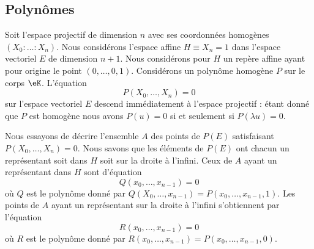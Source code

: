 \subsection{Polynômes}

Soit l'espace projectif de dimension \( n\) avec ses coordonnées homogènes \( (X_0:\ldots :X_n)\). Nous considérons l'espace affine \( H\equiv X_n=1\) dans l'espace vectoriel \( E\) de dimension \( n+1\). Nous considérons pour \( H\) un repère affine ayant pour origine le point \( (0,\ldots, 0,1)\). Considérons un polynôme homogène \( P\) sur le corps \( \eK\). L'équation
\begin{equation}
    P(X_0,\ldots, X_n)=0
\end{equation}
sur l'espace vectoriel \( E\) descend immédiatement à l'espace projectif : étant donné que \( P\) est homogène nous avons \( P(u)=0\) si et seulement si \( P(\lambda u)=0\).

Nous essayons de décrire l'ensemble \( A\) des points de \( P(E)\) satisfaisant \( P(X_0,\ldots, X_n)=0\). Nous savons que les éléments de \( P(E)\) ont chacun un représentant soit dans \( H\) soit sur la droite à l'infini. Ceux de \( A\) ayant un représentant dans \( H\) sont d'équation
\begin{equation}
    Q(x_0,\ldots, x_{n-1})=0
\end{equation}
où \( Q\) est le polynôme donné par \( Q(X_0,\ldots, x_{n-1})=P(x_0,\ldots, x_{n-1},1)\). Les points de \( A\) ayant un représentant sur la droite à l'infini s'obtiennent par l'équation
\begin{equation}
    R(x_0,\ldots, x_{n-1})=0
\end{equation}
où \( R\) est le polynôme donné par \( R(x_0,\ldots, x_{n-1})=P(x_0,\ldots, x_{n-1},0)\).

